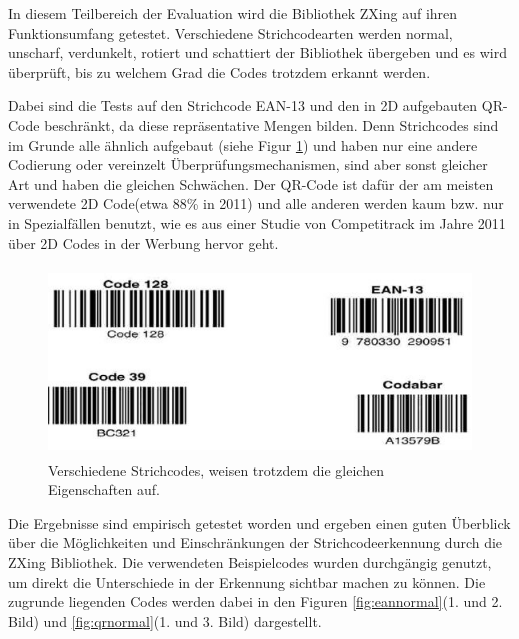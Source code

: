 \writtenby{\dcauthornameriren}%
In diesem Teilbereich der Evaluation wird die Bibliothek ZXing auf ihren Funktionsumfang getestet.
Verschiedene Strichcodearten werden normal, unscharf, verdunkelt, rotiert und schattiert der Bibliothek übergeben und es wird überprüft, bis zu welchem Grad die Codes trotzdem erkannt werden.

Dabei sind die Tests auf den Strichcode EAN-13 und den in 2D aufgebauten QR-Code beschränkt, da diese repräsentative Mengen bilden. Denn Strichcodes sind im Grunde alle ähnlich aufgebaut (siehe Figur \ref*{fig:similarcodes}) und haben nur eine andere Codierung oder vereinzelt Überprüfungsmechanismen, sind aber sonst gleicher Art und haben die gleichen Schwächen. Der QR-Code ist dafür der am meisten verwendete 2D Code(etwa 88\% in 2011) und alle anderen werden kaum bzw. nur in Spezialfällen benutzt, wie es aus einer Studie von Competitrack im Jahre 2011 über 2D Codes in der Werbung hervor geht.

\begin{figure}[H]
  \centering
  \includegraphics[height=5cm]{img/EAN13/strichcodes.jpg}
  \caption{Verschiedene Strichcodes, weisen trotzdem die gleichen Eigenschaften auf.}
  \label{fig:similarcodes}
\end{figure}

Die Ergebnisse sind empirisch getestet worden und ergeben einen guten Überblick über die Möglichkeiten und Einschränkungen der Strichcodeerkennung durch die ZXing Bibliothek. Die verwendeten Beispielcodes wurden durchgängig genutzt, um direkt die Unterschiede in der Erkennung sichtbar machen zu können. Die zugrunde liegenden Codes werden dabei in den Figuren \ref*{fig:eannormal}(1. und 2. Bild) und \ref*{fig:qrnormal}(1. und 3. Bild) dargestellt.
